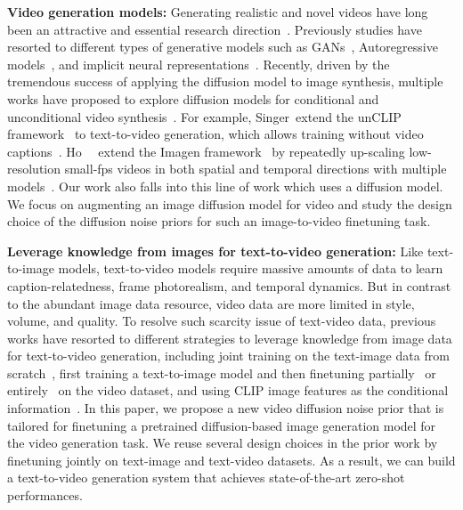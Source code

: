\documentclass[10pt,twocolumn,letterpaper]{article}
\begin{document}
\textbf{Video generation models: }
Generating realistic and novel videos have long been an attractive and essential research direction~\cite{vondrick2016generating,ranzato2014video,yu2022magvit}. Previously studies have resorted to different types of generative models such as GANs~\cite{vondrick2016generating,saito2017temporal,Tulyakov_2018_CVPR,tian2021a,Shen_2023_CVPR}, Autoregressive models~\cite{srivastava2015unsupervised,yan2021videogpt,le2021ccvs,ge2022long,hong2022cogvideo}, and implicit neural representations~\cite{skorokhodov2021stylegan,yu2021generating}. Recently, driven by the tremendous success of applying the diffusion model to image synthesis, multiple works have proposed to explore diffusion models for conditional and unconditional video synthesis~\cite{voleti2022masked,harvey2022flexible,zhou2022magicvideo,wu2022tune,blattmann2023videoldm,khachatryan2023text2video,hoppe2022diffusion,voleti2022masked,yang2022diffusion,nikankin2022sinfusion,luo2023videofusion,an2023latent,wang2023videofactory}. For example, Singer~\etal extend the unCLIP framework~\cite{ramesh2022hierarchical} to text-to-video generation, which allows training without video captions~\cite{singer2022make}. Ho~\etal~\cite{ho2022video} extend the Imagen framework~\cite{saharia2022photorealistic} by repeatedly up-scaling low-resolution small-fps videos in both spatial and temporal directions with multiple models~\cite{ho2022imagen}. Our work also falls into this line of work which uses a diffusion model. We focus on augmenting an image diffusion model for video and study the design choice of the diffusion noise priors for such an image-to-video finetuning task.

\textbf{Leverage knowledge from images for text-to-video generation: } 
Like text-to-image models, text-to-video models require massive amounts of data to learn caption-relatedness, frame photorealism, and temporal dynamics. But in contrast to the abundant image data resource, video data are more limited in style, volume, and quality. To resolve such scarcity issue of text-video data, previous works have resorted to different strategies to leverage knowledge from image data for text-to-video generation, including joint training on the text-image data from scratch~\cite{ho2022video,ho2022imagen,villegas2022phenaki,wu2022nuwa}, first training a text-to-image model and then finetuning partially~\cite{hong2022cogvideo,blattmann2023videoldm,wu2022tune,ma2023follow} or entirely~\cite{singer2022make,esser2023structure} on the video dataset, and using CLIP image features as the conditional information~\cite{singer2022make,zhou2022magicvideo}. In this paper, we propose a new video diffusion noise prior that is tailored for finetuning a pretrained diffusion-based image generation model for the video generation task. We reuse several design choices in the prior work by finetuning jointly on text-image and text-video datasets. As a result, we can build a text-to-video generation system that achieves state-of-the-art zero-shot performances.
\end{document}
